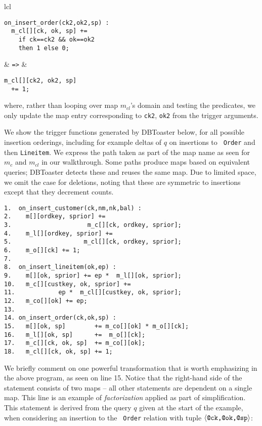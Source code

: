 \vspace{1mm}
\begin{tabular}{lcl}
\hspace{-6mm}
\begin{minipage}{1.65in}
{\footnotesize
\begin{verbatim}
on_insert_order(ck2,ok2,sp) :
  m_cl[][ck, ok, sp] +=
    if ck==ck2 && ok==ok2
    then 1 else 0;
\end{verbatim}
}
\end{minipage}
&
{\tt =>}
&
\hspace{-3.5mm}
\begin{minipage}{1.6in}
{\footnotesize
\begin{verbatim}
m_cl[][ck2, ok2, sp]
  += 1;
\end{verbatim}
}
\end{minipage}
\end{tabular}

\vspace{1mm}
\noindent where, rather than looping over map $m_{cl}$'s domain and testing the
predicates, we only update the map entry corresponding to {\tt ck2}, {\tt ok2}
from the trigger arguments.

We show the trigger functions generated by DBToaster below, for all possible
insertion orderings, including for example deltas of $q$ on insertions to {\tt
Order} and then {\tt Lineitem}.  We express the path taken as part of the map
name as seen for $m_{c}$ and $m_{cl}$ in our walkthrough. Some paths produce
maps based on equivalent queries; DBToaster detects these and reuses the same
map.  Due to limited space, we omit the case for deletions, noting that these
are symmetric to insertions except that they decrement counts.


{\footnotesize
\begin{verbatim}
1.  on_insert_customer(ck,nm,nk,bal) :
2.    m[][ordkey, sprior] +=
3.                     m_c[][ck, ordkey, sprior];
4.    m_l[][ordkey, sprior] +=
5.                    m_cl[][ck, ordkey, sprior];
6.    m_o[][ck] += 1;
7. 
8.  on_insert_lineitem(ok,ep) :
9.    m[][ok, sprior] += ep *  m_l[][ok, sprior];
10.   m_c[][custkey, ok, sprior] +=
11.            ep *  m_cl[][custkey, ok, sprior];
12.   m_co[][ok] += ep;
13.
14. on_insert_order(ck,ok,sp) :
15.   m[][ok, sp]        += m_co[][ok] * m_o[][ck]; 
16.   m_l[][ok, sp]      +=  m_o[][ck];
17.   m_c[][ck, ok, sp]  += m_co[][ok];
18.   m_cl[][ck, ok, sp] += 1;
\end{verbatim}
}

\noindent We briefly comment on one powerful transformation that is worth
emphasizing in the above program, as seen on line 15. Notice that the
right-hand side of the statement consists of two maps -- all other statements
are dependent on a single map. This line is an example of {\em factorization}
applied as part of simplification. This statement is derived from the query $q$
given at the start of the example, when considering an insertion to the {\tt
Order} relation with tuple ${\langle\mbox{{\tt @ck,@ok,@sp}}\rangle}$:

